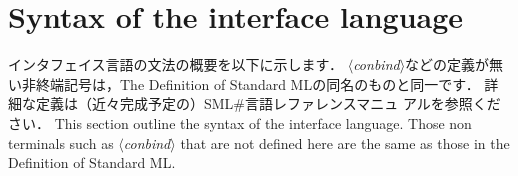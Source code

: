 \documentclass{jbook}
\newcommand{\txt}[2]{#2}
\newcommand{\smlsharp}{SML\#}
\newcommand{\nonterm}[1]{\mbox{$\langle$}{\it #1}\mbox{$\rangle$}}
\begin{document}
\section{\txt{インタフェイス言語の文法}{Syntax of the interface language}}
\label{sec:tutorialInterfaceSyntax}

\ifx\jp%
	インタフェイス言語の文法の概要を以下に示します．
	\nonterm{conbind}などの定義が無い非終端記号は，The Definition of
Standard MLの同名のものと同一です．
	詳細な定義は（近々完成予定の）\smlsharp{}言語レファレンスマニュ
アルを参照ください．
\else%
	This section outline the syntax of the interface language.
	Those non terminals such as \nonterm{conbind} that are not
defined here are the same as those in the Definition of Standard ML.
\fi%
\end{document}
